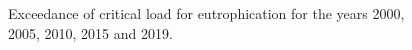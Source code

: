 \begin{figure}[ht]
 \caption{Exceedance of critical load for eutrophication for the years 2000, 2005, 2010, 2015 and 2019.}
\label{fig:eutN}
\end{figure}
